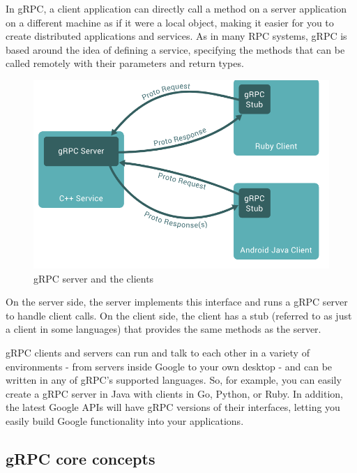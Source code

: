 	In gRPC, a client application can directly call a method on a server application on a different machine as if it were a local object, 
	making it easier for you to create distributed applications and services. As in many RPC systems, gRPC is based around the idea of 
	defining a service, specifying the methods that can be called remotely with their parameters and return types. \cite{grpcspec}
	
	\begin{figure}[h!]
		\includegraphics{include/imgs/grpc_works.PNG}	
		\caption{gRPC server and the clients \cite{grpcspec}}
	\end{figure}

	On the server side, the server implements this interface and runs a gRPC server to handle client calls. On the client side, the
	client has a stub (referred to as just a client in some languages) that provides the same methods as the server.

	gRPC clients and servers can run and talk to each other in a variety of environments - from servers inside Google to your own desktop - 
	and can be written in any of gRPC’s supported languages. So, for example, you can easily create a gRPC server in Java with clients 
	in Go, Python, or Ruby. In addition, the latest Google APIs will have gRPC versions of their interfaces, letting you easily build Google functionality 
	into your applications.

	\subsection{gRPC core concepts}

